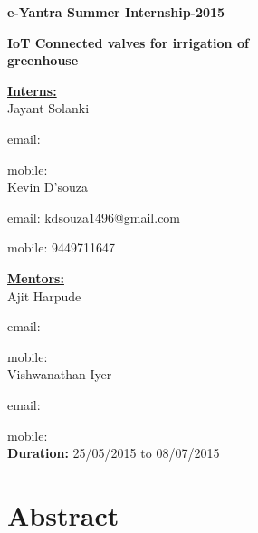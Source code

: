 \documentclass[16pt]{article}
\begin{document}
\begin{titlepage}
 
       

       \hfill\hfill\hfill

       {\LARGE{\textbf{e-Yantra Summer Internship-2015 \\ }}}
       
       \vspace{0.5cm}
       {\Large{\textbf{IoT Connected valves for irrigation of}}} \\  
      
       
        {\Large{\textbf{\hspace{3.2cm} greenhouse}}}
        
         \vspace{0.5cm}
        {\underline{\textbf{Interns:}}} \\
        
        Jayant Solanki 
        
        email: 
        
        mobile: \\
        
        Kevin D'souza
        
        email: kdsouza1496@gmail.com
        
        mobile: 9449711647
        
        \vspace{1cm}
        
          {\underline{\textbf{Mentors:}}} \\
          
          Ajit Harpude 
          
          email: 
        
          mobile: \\
          
          Vishwanathan Iyer
          
          email: 
        
          mobile:  \\
          
          \textbf{Duration:} 25/05/2015 to 08/07/2015
          
\end{titlepage}
\tableofcontents
\vspace{15cm }

\section{Abstract}
\end{document}
